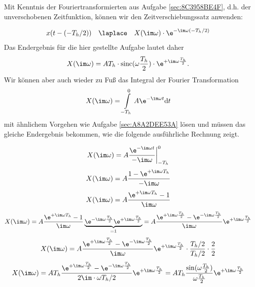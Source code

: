 \begin{Ansatz}
Mit Kenntnis der Fouriertransformierten aus Aufgabe \ref{sec:8C3958BE4F}, d.h. der
unverschobenen Zeitfunktion, können wir den Zeitverschiebungssatz anwenden:

\begin{equation}
x(t - (-T_h/2)) \quad \laplace \quad X(\im\omega) \cdot \e^{-\im\omega (-T_h/2)}
\end{equation}
Das Endergebnis für die hier gestellte Aufgabe lautet daher
\begin{equation}
X(\im \omega) = A T_h \cdot \mathrm{sinc}(\omega\frac{T_h}{2}) \cdot  \e^{+\im\omega\frac{T_h}{2}}.
\end{equation}
Wir können aber auch wieder zu Fuß das Integral der Fourier Transformation
\begin{equation}
X(\im \omega) = \int\limits_{-T_h}^{0} A \e^{-\im \omega t} \mathrm{d}t
\end{equation}
mit ähnlichem Vorgehen wie Aufgabe \ref{sec:A8A2DEE53A} lösen und müssen das
gleiche Endergebnis bekommen, wie die folgende ausführliche Rechnung zeigt.
\end{Ansatz}
\begin{ExCalc}
\begin{equation}
X(\im \omega) = A \frac{\e^{-\im \omega t}}{-\im \omega} \bigg|_{-T_h}^{0}
\end{equation}
\begin{equation}
X(\im \omega) = A \frac{1 - \e^{+\im \omega T_h}}{-\im \omega}
\end{equation}
\begin{equation}
X(\im \omega) = A \frac{\e^{+\im \omega T_h}-1}{\im \omega}
\end{equation}
\begin{equation}
X(\im \omega) = A \frac{\e^{+\im \omega T_h}-1}{\im \omega} \underbrace{\e^{-\im\omega\frac{T_h}{2}} \e^{+\im\omega\frac{T_h}{2}}}_{=1}=
A \frac{\e^{+\im\omega\frac{T_h}{2}} - \e^{-\im\omega\frac{T_h}{2}}}{\im\omega} \e^{+\im\omega\frac{T_h}{2}}
\end{equation}
\begin{equation}
X(\im \omega) = A \frac{\e^{+\im\omega\frac{T_h}{2}} - \e^{-\im\omega\frac{T_h}{2}}}{\im\omega} \e^{+\im\omega\frac{T_h}{2}}
\cdot \frac{T_h/2}{T_h/2} \cdot \frac{2}{2}
\end{equation}
\begin{equation}
X(\im \omega) = A T_h \frac{\e^{+\im\omega\frac{T_h}{2}} - \e^{-\im\omega\frac{T_h}{2}}}{2 \im \cdot \omega T_h/2} \e^{+\im\omega\frac{T_h}{2}} =
A T_h \frac{\sin(\omega\frac{T_h}{2})}{\omega\frac{T_h}{2}} \e^{+\im\omega\frac{T_h}{2}}
\end{equation}
\end{ExCalc}
